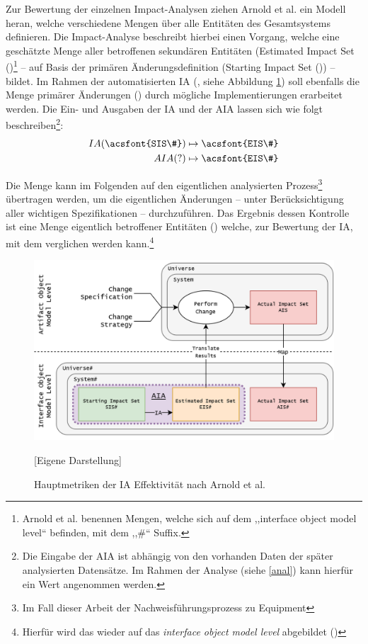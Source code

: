     Zur Bewertung der einzelnen Impact-Analysen ziehen Arnold et al. ein Modell heran, welche verschiedene Mengen über alle Entitäten des Gesamtsystems definieren.
    Die Impact-Analyse beschreibt hierbei einen Vorgang, welche eine geschätzte Menge aller betroffenen sekundären Entitäten (Estimated Impact Set ()\footnote{Arnold et al. benennen Mengen, welche sich auf dem ,,interface object model level`` befinden, mit dem ,,\#`` Suffix.} -- auf Basis der primären Änderungsdefinition (Starting Impact Set ()) -- bildet.
    Im Rahmen der automatisierten \ac{IA} (, siehe Abbildung \ref{fig:aia}) soll ebenfalls die Menge primärer Änderungen () durch mögliche Implementierungen erarbeitet werden.
    Die Ein- und Ausgaben der \acf{IA} und der \acf{AIA} lassen sich wie folgt beschreiben\footnote{Die Eingabe der \ac{AIA} ist abhängig von den vorhanden Daten der später analysierten Datensätze. Im Rahmen der Analyse (siehe \ref{anal}) kann hierfür ein Wert angenommen werden.}:
    \begin{align}
        IA(\text{\acsfont{SIS\#}}) &\mapsto \text{\acsfont{EIS\#}} \\
        AIA(?)                     &\mapsto \text{\acsfont{EIS\#}}
    \end{align}
    
    \noindent
    Die  Menge kann im Folgenden auf den eigentlichen analysierten Prozess\footnote{Im Fall dieser Arbeit der Nachweisführungsprozess zu \atmans{} Equipment} übertragen werden, um die eigentlichen Änderungen -- unter Berücksichtigung  aller wichtigen Spezifikationen -- durchzuführen.
    Das Ergebnis dessen Kontrolle ist eine Menge eigentlich betroffener Entitäten () welche, zur Bewertung der \ac{IA}, mit dem  verglichen werden kann.\footnote{Hierfür wird das  wieder auf das \textit{interface object model level} abgebildet ()}
    
    \begin{figure}[H]
        \centering
        \includegraphics[width=1\linewidth]{gfx/IA35.drawio.png}
        \caption{Hauptmetriken der \ac{IA} Effektivität nach Arnold et al. \cite[296]{app_bohner}}
        [Eigene Darstellung]
        \label{fig:aia}
    \end{figure}
    
